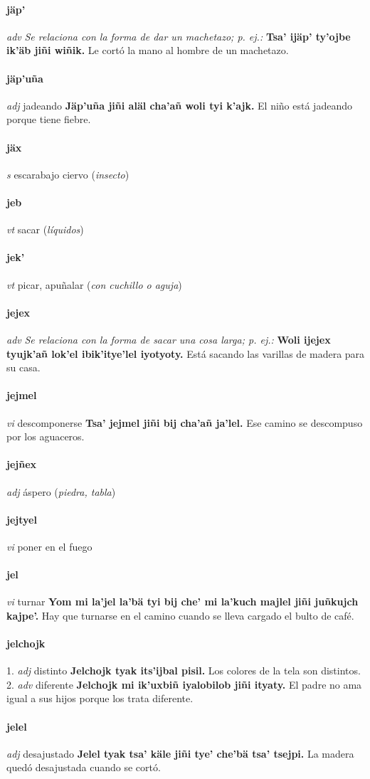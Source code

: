 \documentclass{scrbook}
\newcommand{\entry}[1]{\paragraph{#1}}
\newcommand{\onedefinition}[1]{#1.}
\newcommand{\nontranslationdef}[1]{\textit{#1}}
\newcommand{\partofspeech}[1]{\textit{#1}}
\newcommand{\spanishtranslation}[1]{#1}
\newcommand{\clarification}[1]{(\textit{#1})}
\newcommand{\cholexample}[1]{\textbf{#1}}
\newcommand{\exampletranslation}[1]{#1}
\begin{document}
\begin{multicols}{2}
\entry{jäp'}
\partofspeech{adv}
\nontranslationdef{Se relaciona con la forma de dar un machetazo; p. ej.:}
\cholexample{Tsa' ijäp' ty'ojbe ik'äb jiñi wiñik.}
\exampletranslation{Le cortó la mano al hombre de un machetazo.}

\entry{jäp'uña}
\partofspeech{adj}
\spanishtranslation{jadeando}
\cholexample{Jäp'uña jiñi aläl cha'añ woli tyi k'ajk.}
\exampletranslation{El niño está jadeando porque tiene fiebre.}

\entry{jäx}
\partofspeech{s}
\spanishtranslation{escarabajo ciervo}
\clarification{insecto}

\entry{jeb}
\partofspeech{vt}
\spanishtranslation{sacar}
\clarification{líquidos}

\entry{jek'}
\partofspeech{vt}
\spanishtranslation{picar, apuñalar}
\clarification{con cuchillo o aguja}

\entry{jejex}
\partofspeech{adv}
\nontranslationdef{Se relaciona con la forma de sacar una cosa larga; p. ej.:}
\cholexample{Woli ijejex tyujk'añ lok'el ibik'itye'lel iyotyoty.}
\exampletranslation{Está sacando las varillas de madera para su casa.}

\entry{jejmel}
\partofspeech{vi}
\spanishtranslation{descomponerse}
\cholexample{Tsa' jejmel jiñi bij cha'añ ja'lel.}
\exampletranslation{Ese camino se descompuso por los aguaceros.}

\entry{jejñex}
\partofspeech{adj}
\spanishtranslation{áspero}
\clarification{piedra, tabla}

\entry{jejtyel}
\partofspeech{vi}
\spanishtranslation{poner en el fuego}

\entry{jel}
\partofspeech{vi}
\spanishtranslation{turnar}
\cholexample{Yom mi la'jel la'bä tyi bij che' mi la'kuch majlel jiñi juñkujch kajpe'.}
\exampletranslation{Hay que turnarse en el camino cuando se lleva cargado el bulto de café.}

\entry{jelchojk}
\onedefinition{1}
\partofspeech{adj}
\spanishtranslation{distinto}
\cholexample{Jelchojk tyak its'ijbal pisil.}
\exampletranslation{Los colores de la tela son distintos.}
\onedefinition{2}
\partofspeech{adv}
\spanishtranslation{diferente}
\cholexample{Jelchojk mi ik'uxbiñ iyalobilob jiñi ityaty.}
\exampletranslation{El padre no ama igual a sus hijos porque los trata diferente.}

\entry{jelel}
\partofspeech{adj}
\spanishtranslation{desajustado}
\cholexample{Jelel tyak tsa' käle jiñi tye' che'bä tsa' tsejpi.}
\exampletranslation{La madera quedó desajustada cuando se cortó.}


\end{multicols}
\end{document}
